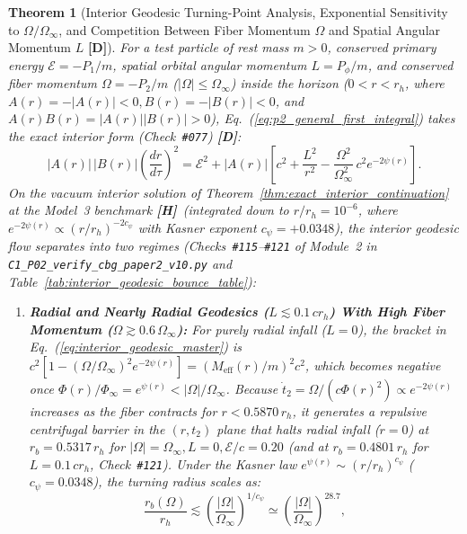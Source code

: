 \documentclass[11pt,a4paper]{article}
\newcommand{\catD}{\textbf{\textcolor{blue!75!black}{[D]}}}
\newcommand{\catH}{\textbf{\textcolor{orange!85!black}{[H]}}}
\theoremstyle{plain}
\newtheorem{theorem}{Theorem}[section]
\theoremstyle{definition}
\theoremstyle{remark}
\numberwithin{equation}{section}
\begin{document}
\begin{theorem}[Interior Geodesic Turning-Point Analysis, Exponential Sensitivity to $\Omega/\Omega_{\infty}$, and Competition Between Fiber Momentum $\Omega$ and Spatial Angular Momentum $L$ \catD]
\label{thm:interior_geodesic_bounce}
For a test particle of rest mass $m > 0$, conserved primary energy $\mathcal{E} = -P_1/m$, spatial orbital angular momentum $L = P_{\phi}/m$, and conserved fiber momentum $\Omega = -P_2/m$ ($\vert\Omega\vert \le \Omega_{\infty}$) inside the horizon ($0 < r < r_h$, where $A(r) = -|A(r)| < 0, B(r) = -|B(r)| < 0$, and $A(r)B(r) = |A(r)||B(r)| > 0$), Eq.~(\ref{eq:p2_general_first_integral}) takes the exact interior form (Check~\texttt{\#077}) \catD:
\begin{equation}
  |A(r)|\,|B(r)|\left(\frac{dr}{d\tau}\right)^2 = \mathcal{E}^2 + |A(r)|\left[c^2 + \frac{L^2}{r^2} - \frac{\Omega^2}{\Omega_{\infty}^2}\,c^2 e^{-2\psi(r)}\right].
  \label{eq:interior_geodesic_master}
\end{equation}
On the vacuum interior solution of Theorem~\ref{thm:exact_interior_continuation} at the Model~3 benchmark \catH\ (integrated down to $r/r_h = 10^{-6}$, where $e^{-2\psi(r)} \propto (r/r_h)^{-2c_{\psi}}$ with Kasner exponent $c_{\psi} = +0.0348$), the interior geodesic flow separates into two regimes (Checks~\texttt{\#115}--\texttt{\#121} of Module~2 in \allowbreak\texttt{C1\_P02\_verify\_cbg\_paper2\_v10.py} and Table~\ref{tab:interior_geodesic_bounce_table}):
\begin{enumerate}
    \item[\textnormal{(i)}] \textbf{Radial and Nearly Radial Geodesics ($L \lesssim 0.1\,c r_h$) With High Fiber Momentum ($\Omega \gtrsim 0.6\,\Omega_{\infty}$):} For purely radial infall ($L = 0$), the bracket in Eq.~(\ref{eq:interior_geodesic_master}) is $c^2[1 - (\Omega/\Omega_{\infty})^2 e^{-2\psi(r)}] = (M_{\text{eff}}(r)/m)^2 c^2$, which becomes negative once $\Phi(r)/\Phi_{\infty} = e^{\psi(r)} < |\Omega|/\Omega_{\infty}$. Because $\dot{t}_2 = \Omega/(c\Phi(r)^2) \propto e^{-2\psi(r)}$ increases as the fiber contracts for $r < 0.5870\,r_h$, it generates a repulsive centrifugal barrier in the $(r, t_2)$ plane that halts radial infall ($\dot{r} = 0$) at $r_b = 0.5317\,r_h$ for $|\Omega| = \Omega_{\infty}, L = 0, \mathcal{E}/c = 0.20$ (and at $r_b = 0.4801\,r_h$ for $L = 0.1\,c r_h$, Check~\texttt{\#121}). Under the Kasner law $e^{\psi(r)} \sim (r/r_h)^{c_{\psi}}$ ($c_{\psi} = 0.0348$), the turning radius scales as:
    \begin{equation}
      \frac{r_b(\Omega)}{r_h} \lesssim \left(\frac{|\Omega|}{\Omega_{\infty}}\right)^{1/c_{\psi}} \simeq \left(\frac{|\Omega|}{\Omega_{\infty}}\right)^{28.7},

\end{equation}
\end{enumerate}
\end{theorem}
\end{document}
